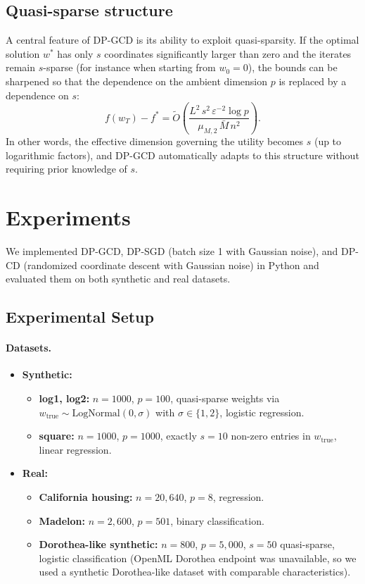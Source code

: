 \documentclass[11pt,a4paper]{article}
\begin{document}
\subsection{Quasi-sparse structure}

A central feature of DP-GCD is its ability to exploit quasi-sparsity. If the optimal solution $w^*$ has only $s$ coordinates significantly larger than zero and the iterates remain $s$-sparse (for instance when starting from $w_0 = 0$), the bounds can be sharpened so that the dependence on the ambient dimension $p$ is replaced by a dependence on $s$:
\[
f(w_T) - f^* = \widetilde{O}\!\left( \frac{L^2 \, s^2 \, \varepsilon^{-2} \log p}{\mu_{M,2} \, \bar{M} \, n^2} \right).
\]
In other words, the effective dimension governing the utility becomes $s$ (up to logarithmic factors), and DP-GCD automatically adapts to this structure without requiring prior knowledge of $s$.

\section{Experiments}

We implemented DP-GCD, DP-SGD (batch size 1 with Gaussian noise), and DP-CD (randomized coordinate descent with Gaussian noise) in Python and evaluated them on both synthetic and real datasets.

\subsection{Experimental Setup}

\paragraph{Datasets.}
\begin{itemize}
\item \textbf{Synthetic:}
\begin{itemize}
\item \textbf{log1, log2:} $n = 1000$, $p = 100$, quasi-sparse weights via $w_{\text{true}} \sim \text{LogNormal}(0, \sigma)$ with $\sigma \in \{1, 2\}$, logistic regression.
\item \textbf{square:} $n = 1000$, $p = 1000$, exactly $s = 10$ non-zero entries in $w_{\text{true}}$, linear regression.
\end{itemize}
\item \textbf{Real:}
\begin{itemize}
\item \textbf{California housing:} $n = 20{,}640$, $p = 8$, regression.
\item \textbf{Madelon:} $n = 2{,}600$, $p = 501$, binary classification.
\item \textbf{Dorothea-like synthetic:} $n = 800$, $p = 5{,}000$, $s = 50$ quasi-sparse, logistic classification (OpenML Dorothea endpoint was unavailable, so we used a synthetic Dorothea-like dataset with comparable characteristics).
\end{itemize}
\end{itemize}
\end{document}
